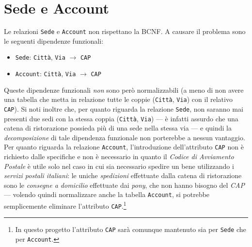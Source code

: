\section{Sede e Account}\label{sec:sedeaccount}
Le relazioni {\tt Sede} e {\tt Account} non rispettano la BCNF. A causare il problema
sono le seguenti dipendenze funzionali:
\begin{itemize}
\item {\tt Sede}: {\tt Città}, {\tt Via} $\rightarrow$ {\tt CAP}
\item {\tt Account}: {\tt Città}, {\tt Via} $\rightarrow$ {\tt CAP}
\end{itemize}
Queste dipendenze funzionali {\it non} sono però normalizzabili (a meno di non avere una tabella
che metta in relazione tutte le coppie ({\tt Città}, {\tt Via}) con il relativo {\tt CAP}). Si
noti inoltre che, per quanto riguarda la relazione {\tt Sede}, non saranno mai presenti
due sedi con la stessa coppia ({\tt Città}, {\tt Via}) --- è infatti assurdo che una catena
di ristorazione possieda più di una sede nella stessa via --- e quindi la {\it decomposizione}
di tale dipendenza funzionale non porterebbe a nessun vantaggio. Per quanto riguarda la
relazione {\tt Account}, l'introduzione dell'attributo {\tt CAP} non è richiesto dalle
specifiche e non è necessario in quanto il {\it Codice di Avviamento Postale} è utile solo
nel caso in cui sia necessario spedire un bene utilizzando i {\it servizi postali italiani}: le
uniche {\it spedizioni} effettuate dalla catena di ristorazione sono le {\it consegne a
domicilio} effettuate dai {\it pony}, che non hanno bisogno del {\it CAP} --- volendo quindi
normalizzare anche la tabella {\tt Account}, si potrebbe semplicemente eliminare
l'attributo {\tt CAP}.\footnote{In questo progetto l'attributo {\tt CAP} sarà comunque mantenuto sia per {\tt Sede} che per {\tt Account}.}
